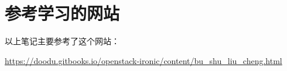 \documentclass[a4paper,left=2.5cm,right=2.5cm,11pt]{article}
\begin{document}
\section{参考学习的网站}
	以上笔记主要参考了这个网站：\par
	\url{https://doodu.gitbooks.io/openstack-ironic/content/bu_shu_liu_cheng.html}
\end{document}

